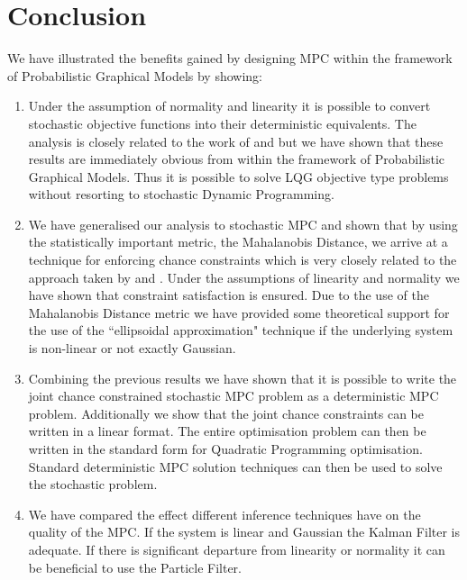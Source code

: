 \section{Conclusion}
We have illustrated the benefits gained by designing MPC within the framework of Probabilistic Graphical Models by showing:
\begin{enumerate}
\item
Under the assumption of normality and linearity it is possible to convert stochastic objective functions into their deterministic equivalents. The analysis is closely related to the work of \cite{yan1} and \cite{yan2} but we have shown that these results are immediately obvious from within the framework of Probabilistic Graphical Models. Thus it is possible to solve LQG objective type problems without resorting to stochastic Dynamic Programming.
\item
We have generalised our analysis to stochastic MPC and shown that by using the statistically important metric, the Mahalanobis Distance, we arrive at a technique for enforcing chance constraints which is very closely related to the approach taken by \cite{vanhessem2} and \cite{vanhessem1}. Under the assumptions of linearity and normality we have shown that constraint satisfaction is ensured. Due to the use of the Mahalanobis Distance metric we have provided some theoretical support for the use of the ``ellipsoidal approximation" technique if the underlying system is non-linear or not exactly Gaussian.
\item
Combining the previous results we have shown that it is possible to write the joint chance constrained stochastic MPC problem as a deterministic MPC problem. Additionally we show that the joint chance constraints can be written in a linear format. The entire optimisation problem can then be written in the standard form for Quadratic Programming optimisation. Standard deterministic MPC solution techniques can then be used to solve the stochastic problem.
\item
We have compared the effect different inference techniques have on the quality of the MPC. If the system is linear and Gaussian the Kalman Filter is adequate. If there is significant departure from linearity or normality it can be beneficial to use the Particle Filter.
\end{enumerate}